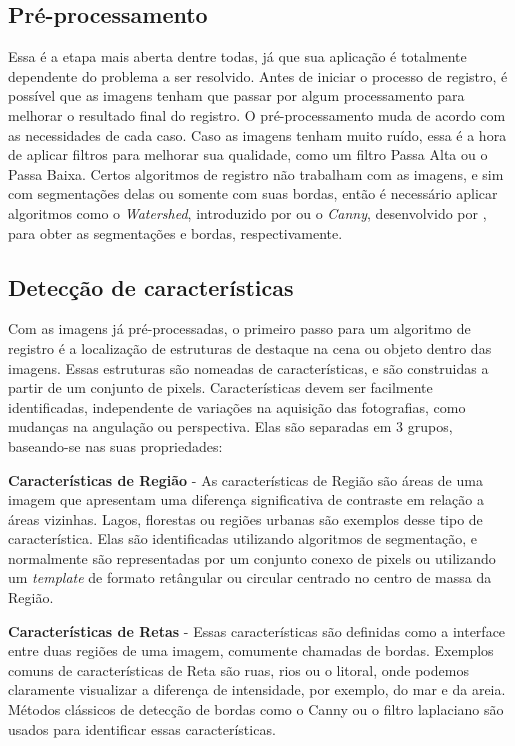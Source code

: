 \subsection{Pré-processamento}
    Essa é a etapa mais aberta dentre todas, já que sua aplicação é totalmente dependente do problema a ser resolvido. 
Antes de iniciar o processo de registro, é possível que as imagens tenham que passar por algum processamento para 
melhorar o resultado final do registro. O pré-processamento muda de acordo com as necessidades de cada caso. Caso as
imagens tenham muito ruído, essa é a hora de aplicar filtros para melhorar sua qualidade, como um filtro Passa Alta ou 
o Passa Baixa. Certos algoritmos de registro não trabalham com as imagens, e sim com segmentações delas ou somente com 
suas bordas, então é necessário aplicar algoritmos como o \textit{Watershed}, introduzido por \cite{vincent1991watersheds}
ou o \textit{Canny}, desenvolvido por \cite{canny1986computational}, para obter as segmentações e bordas, respectivamente.

\subsection{Detecção de características}
\label{sec:dec_corr_carac}

    Com as imagens já pré-processadas, o primeiro passo para um algoritmo de registro é a localização de estruturas de 
destaque na cena ou objeto dentro das imagens. Essas estruturas são nomeadas de características, e são construidas a partir
de um conjunto de pixels. Características devem ser facilmente identificadas, independente de variações na aquisição das 
fotografias, como mudanças na angulação ou perspectiva. Elas são separadas em 3 grupos, baseando-se nas suas propriedades:

\textbf{Características de Região} - As características de Região são áreas de uma imagem que apresentam uma diferença
significativa de contraste em relação a áreas vizinhas. Lagos, florestas ou regiões urbanas são exemplos desse tipo de 
característica. Elas são identificadas utilizando algoritmos de segmentação, e normalmente são representadas por um
conjunto conexo de pixels ou utilizando um \textit{template} de formato retângular ou circular centrado no centro de 
massa da Região.

\textbf{Características de Retas} - Essas características são definidas como a interface entre duas regiões de uma imagem,
comumente chamadas de bordas. Exemplos comuns de características de Reta são ruas, rios ou o litoral, onde podemos 
claramente visualizar a diferença de intensidade, por exemplo, do mar e da areia. Métodos clássicos de detecção de bordas 
como o Canny ou o filtro laplaciano são usados para identificar essas características.

